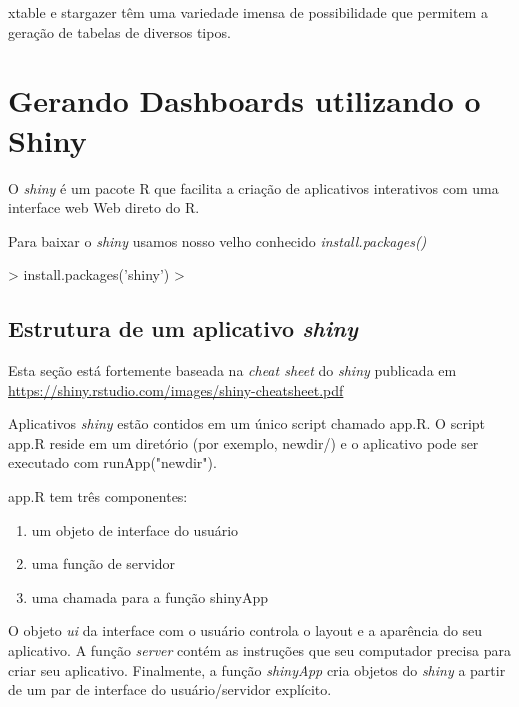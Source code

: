 \documentclass[12pt,a4paper,oneside]{erdc}
\begin{document}
	
xtable e stargazer têm uma variedade imensa de possibilidade que permitem a geração de tabelas de diversos tipos. 


\section{Gerando Dashboards utilizando o Shiny}

O \textit{shiny} é um pacote R que facilita a criação de aplicativos interativos com uma interface web Web direto do R.

Para baixar o \textit{shiny} usamos nosso velho conhecido \textit{install.packages()}

\begin{Schunk}
\begin{Sinput}
> install.packages('shiny')
> 
\end{Sinput}
\end{Schunk}


\subsection{Estrutura de um aplicativo \textit{shiny}}

Esta seção está fortemente baseada na \textit{cheat sheet} do \textit{shiny} publicada em  \url{https://shiny.rstudio.com/images/shiny-cheatsheet.pdf}

Aplicativos \textit{shiny} estão contidos em um único script chamado app.R. O script app.R reside em um diretório (por exemplo, newdir/) e o aplicativo pode ser executado com runApp("newdir").


app.R tem três componentes:

\begin{enumerate}
	\item um objeto de interface do usuário
	
	\item uma função de servidor
	
	\item uma chamada para a função shinyApp
	
\end{enumerate}

O objeto \textit{ui} da interface com o usuário controla o layout e a aparência do seu aplicativo. A função \textit{server} contém as instruções que seu computador precisa para criar seu aplicativo. Finalmente, a função \textit{shinyApp} cria objetos do \textit{shiny} a partir de um par de interface do usuário/servidor explícito.
\end{document}
